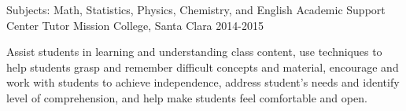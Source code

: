 \begin{cventries}
   \cventry
	  {Subjects: Math, Statistics, Physics, Chemistry, and English}
	  {Academic Support Center Tutor}
	  {Mission College, Santa Clara}
	  {2014-2015}
	  {
	  	\vspace{0.1cm}
	  	\begin{cvitems}
	  		\item {Assist students in learning and understanding class content, use techniques to help students grasp and remember difficult concepts and material, encourage and work with students to achieve independence, address student’s needs and identify level of comprehension, and help make students feel comfortable and open.}
	  	\end{cvitems}
	  }
  
  
\end{cventries}
